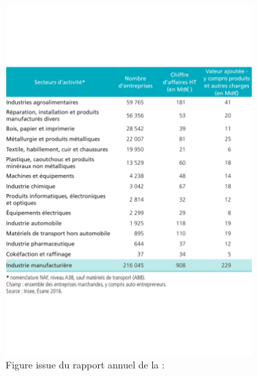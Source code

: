 \begin{figure}[hbt]
	\centering
	\includegraphics[width=0.85\textwidth,height=\textheight,keepaspectratio]{../Chap1/Figures/2018-Chiffres-cles-industrie-manufacturiere-secteur.pdf}
	\caption{Figure issue du rapport annuel de la \citeauthor{directiongeneraledesentreprises_chiffres_2019} :   \cite{directiongeneraledesentreprises_chiffres_2019}}
	\label{fig:molding_economy}
\end{figure}

